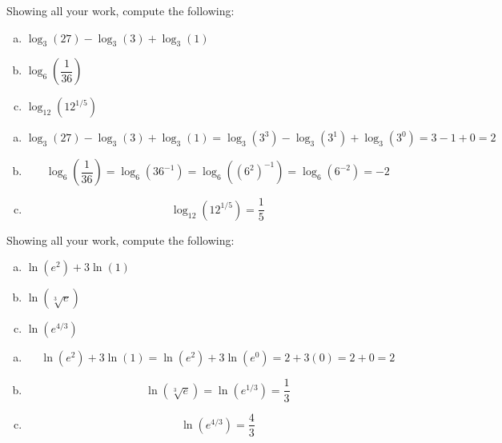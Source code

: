 \documentclass[11pt,letterpaper]{article}
\begin{document}

 Showing all your work, compute the following:
	\begin{enumerate}[(a)]
	\item $\log_3(27) - \log_3(3) + \log_3(1)$
	\item $\log_6 \left(\dfrac{1}{36} \right)$
	\item $\log_{12}(12^{1/5})$
	\end{enumerate} \pspace

\sol
\begin{enumerate}[(a)]
\item 
	\[
	\log_3(27) - \log_3(3) + \log_3(1)= \log_3(3^3) - \log_3(3^1) + \log_3(3^0)= 3 - 1 + 0= 2
	\] \pspace

\item 
	\[
	\log_6 \left(\dfrac{1}{36}\right)= \log_6(36^{-1})= \log_6\left((6^2)^{-1}\right)= \log_6(6^{-2})= -2
	\] \pspace

\item 
	\[
	\log_{12}(12^{1/5})= \dfrac{1}{5}
	\]
\end{enumerate}



\newpage



 Showing all your work, compute the following:
	\begin{enumerate}[(a)]
	\item $\ln(e^2) + 3 \ln(1)$
	\item $\ln(\sqrt[3]{e})$
	\item $\ln(e^{4/3})$
	\end{enumerate} \pspace

\sol
\begin{enumerate}[(a)]
\item 
	\[
	\ln(e^2) + 3 \ln(1)= \ln(e^2) + 3 \ln(e^0)= 2 + 3(0)= 2 + 0= 2
	\] \pspace

\item 
	\[
	\ln(\sqrt[3]{e})= \ln(e^{1/3})= \dfrac{1}{3}
	\] \pspace

\item 
	\[
	\ln(e^{4/3})= \dfrac{4}{3}
	\]
\end{enumerate}
\end{document}
